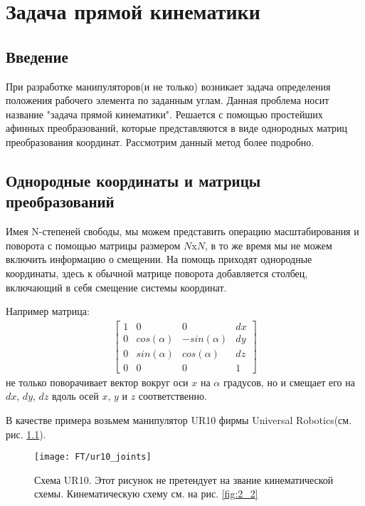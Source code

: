 \chapter{Задача прямой кинематики} \label{ch:2}

\section{Введение} \label{sect2_1}
При разработке манипуляторов(и не только) возникает задача определения положения рабочего элемента по заданным углам. Данная проблема носит название "задача прямой кинематики". Решается с помощью простейших афинных преобразований, которые представляются в виде однородных матриц преобразования координат. Рассмотрим данный метод более подробно.

\section{Однородные координаты и матрицы преобразований}\label{sect2_2}
Имея N-степеней свободы, мы можем представить операцию масштабирования и поворота с помощью матрицы размером $N$x$N$, в то же время мы не можем включить информацию о смещении. На помощь приходят однородные координаты, здесь к обычной матрице поворота добавляется столбец, включающий в себя смещение системы координат.

Например матрица:
\begin{align*}
	\begin{bmatrix}
		1	&	0				&	0				&	dx\\
		0	&	cos(\alpha)		&	-sin(\alpha)	&	dy\\
		0	&	sin(\alpha)		&	cos(\alpha)		&	dz\\
		0	&	0				&	0				&	1
	\end{bmatrix}
\end{align*}
не только поворачивает вектор вокруг оси $x$ на $\alpha$ градусов, но и смещает его на $dx$, $dy$, $dz$ вдоль осей $x$, $y$ и $z$ соответственно.

В качестве примера возьмем манипулятор UR10 фирмы Universal Robotics(см. рис. \ref{fig:ft_sheme1}). 
\begin{figure}[ht]
	\centering
	\texttt{[image: FT/ur10\_joints]}
	\caption{Схема UR10. Этот рисунок не претендует на звание кинематической схемы. Кинематическую схему см. на рис. \ref{fig:2_2}}
	\label{fig:ft_sheme1}
\end{figure}

